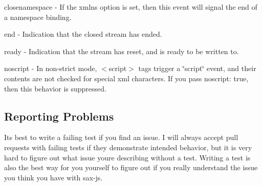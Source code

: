 {\ttfamily closenamespace} -\/ If the {\ttfamily xmlns} option is set, then this event will signal the end of a namespace binding.

{\ttfamily end} -\/ Indication that the closed stream has ended.

{\ttfamily ready} -\/ Indication that the stream has reset, and is ready to be written to.

{\ttfamily noscript} -\/ In non-\/strict mode, {\ttfamily $<$script$>$} tags trigger a {\ttfamily \char`\"{}script\char`\"{}} event, and their contents are not checked for special xml characters. If you pass {\ttfamily noscript\+: true}, then this behavior is suppressed.

\subsection*{Reporting Problems}

It\textquotesingle{}s best to write a failing test if you find an issue. I will always accept pull requests with failing tests if they demonstrate intended behavior, but it is very hard to figure out what issue you\textquotesingle{}re describing without a test. Writing a test is also the best way for you yourself to figure out if you really understand the issue you think you have with sax-\/js. 